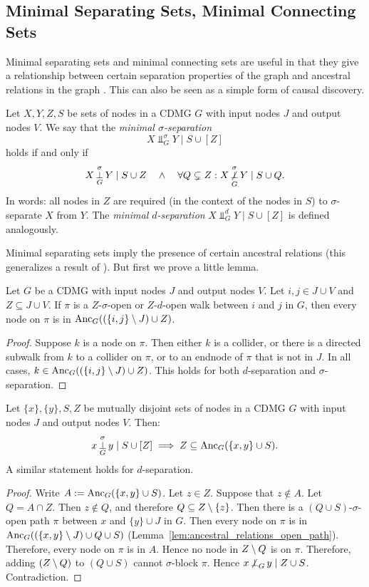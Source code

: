 \subsection{Minimal Separating Sets, Minimal Connecting Sets}

Minimal separating sets and minimal connecting sets are useful in that they give a relationship between
certain separation properties of the graph and ancestral relations in the graph \cite{SMR1999,ClaassenHeskes2011}.
This can also be seen as a simple form of causal discovery.

\begin{Def}\label{def:min_sep}
Let $X,Y,Z,S$ be sets of nodes in a CDMG $G$ with input nodes $J$ and output nodes $V$. 
We say that the \emph{minimal $\sigma$-separation}
  $$X \Perp_{G}^\sigma Y \mid S \cup [Z]$$
holds if and only if
  $$X \operatorname*{\perp}_{G}^\sigma Y \mid S \cup Z \quad\land\quad \forall Q \subsetneq Z: X \operatorname*{\not\perp}_G^\sigma Y \mid S \cup Q.$$
In words: all nodes in $Z$ are required (in the context of the nodes in $S$) to $\sigma$-separate $X$ from $Y$.
The \emph{minimal $d$-separation} $X \Perp_{G}^d Y \mid S \cup [Z]$ is defined analogously.
\end{Def}

Minimal separating sets imply the presence of certain ancestral relations (this generalizes a result of \cite{SMR1999}).
But first we prove a little lemma.
\begin{Lem}\label{lem:ancestral_relations_open_path}
  Let $G$ be a CDMG with input nodes $J$ and output nodes $V$. Let $i, j \in J \cup V$ and $Z \subseteq J \cup V$.
  If $\pi$ is a $Z$-$\sigma$-open or $Z$-$d$-open walk between $i$ and $j$ in $G$, then every node on $\pi$ is in $\mathrm{Anc}_G((\{i,j\} \setminus J) \cup Z)$.
\end{Lem}
\begin{proof}
  Suppose $k$ is a node on $\pi$. 
  Then either $k$ is a collider, or there is a directed subwalk from $k$ to a collider on $\pi$, or to an endnode of $\pi$ that is not in $J$. 
  In all cases, $k \in \mathrm{Anc}_G((\{i,j\}\setminus J)\cup Z)$.
  This holds for both $d$-separation and $\sigma$-separation.
\end{proof}
\begin{Prp}\label{prp:min_sep}
Let $\{x\},\{y\},S,Z$ be mutually disjoint sets of nodes in a CDMG $G$ with input nodes $J$ and output nodes $V$.
Then:
$$x \operatorname*{\perp}^\sigma_G y \mid S \cup [Z] \implies Z \subseteq \mathrm{Anc}_{G}(\{x, y\} \cup S).$$
A similar statement holds for $d$-separation.
\end{Prp}
\begin{proof}
  Write $A := \mathrm{Anc}_G(\{x,y\} \cup S)$.
  Let $z \in Z$. 
  Suppose that $z \notin A$. 
  Let $Q = A \cap Z$.
  Then $z \notin Q$, and therefore $Q \subseteq Z \setminus \{z\}$.
  Then there is a $(Q \cup S)$-$\sigma$-open path $\pi$ between $x$ and $\{y\} \cup J$ in $G$.
  Then every node on $\pi$ is in $\mathrm{Anc}_G((\{x,y\} \setminus J) \cup Q \cup S)$ (Lemma~\ref{lem:ancestral_relations_open_path}).
  Therefore, every node on $\pi$ is in $A$.
  Hence no node in $Z \setminus Q$ is on $\pi$.
  Therefore, adding $(Z \setminus Q)$ to $(Q \cup S)$ cannot $\sigma$-block $\pi$.
  Hence $x \operatorname*{\not\perp}_G y \mid Z \cup S$. Contradiction.
\end{proof}

